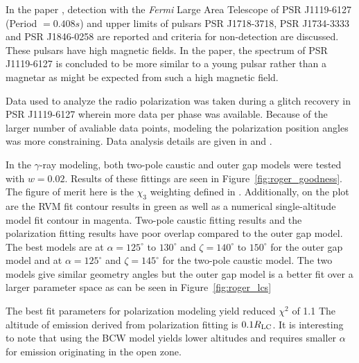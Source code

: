 In the paper \cite{parent2011observations}, detection 
with the {\it Fermi} Large Area Telescope
of PSR J1119-6127 (Period $=0.408s$) and 
upper limits of pulsars PSR J1718-3718, PSR J1734-3333 and PSR J1846-0258
are reported and criteria for non-detection are discussed.
These pulsars have high magnetic fields.
In the paper, the spectrum of PSR J1119-6127 is concluded to be more 
similar to a young pulsar rather than a magnetar as might
be expected from such a high magnetic field.

Data used to analyze the radio polarization was
taken during a 
glitch recovery in PSR J1119-6127 wherein
more data per phase was available.
Because of the larger number of avaliable data points,
modeling the polarization position
angles was more constraining.
Data analysis details are given in 
\cite{weltevrede2010pulsar} and \cite{hobbs2004long}.

In the $\gamma$-ray modeling, both two-pole caustic
and outer gap models were tested with
$w=0.02$.  Results of these fittings are seen in 
Figure~\ref{fig:roger_goodness}. 
The figure of merit here is the  
$\chi_3$ weighting defined in \cite{romani2010constraining}.
Additionally, on the plot are the  
RVM fit contour results in green as well as a numerical 
single-altitude model fit contour in magenta.  
Two-pole caustic fitting results and the polarization
fitting results have poor overlap compared to the outer gap model.
The best models are at $\alpha=125^\circ$ to $130^\circ$
and $\zeta=140^\circ$ to $150^\circ$ for the outer
gap model and at $\alpha=125^\circ$ and $\zeta=145^\circ$
for the two-pole caustic model. 
The two models give similar geometry angles but 
the outer gap model is a better
fit over a larger parameter space as can be seen in Figure~\ref{fig:roger_lcs}

The best fit parameters for polarization
modeling yield reduced $\chi^2$ of 1.1
The altitude of emission derived
from polarization fitting is $0.1R_{\rm{LC}}$.
It is interesting to note that 
using the BCW model yields lower altitudes 
\citep{weltevrede2011glitch} and requires smaller
$\alpha$ for emission originating in the open zone.



